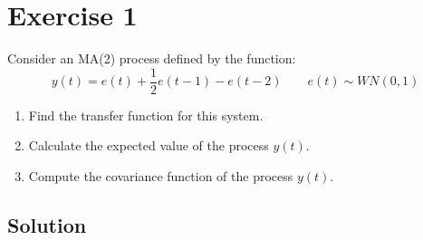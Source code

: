 \section{Exercise 1}

Consider an MA(2) process defined by the function:
\[y(t)=e(t)+\dfrac{1}{2}e(t-1)-e(t-2) \qquad e(t)\sim WN(0,1)\]
\begin{enumerate}
    \item Find the transfer function for this system.
    \item Calculate the expected value of the process $y(t)$. 
    \item Compute the covariance function of the process $y(t)$. 
\end{enumerate}

\subsection*{Solution}
